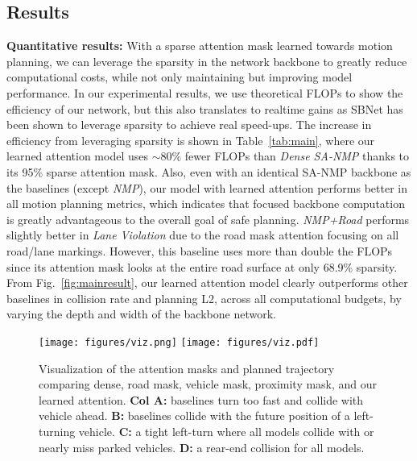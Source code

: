 


\subsection{Results}

\textbf{Quantitative results:} With a sparse attention mask learned towards motion planning, we can leverage the sparsity in the network backbone to greatly reduce computational costs, while not only maintaining but improving model performance. In our experimental results, we use theoretical FLOPs to show the efficiency of our network, but this also translates to realtime gains as SBNet \cite{sbnet} has been shown to leverage sparsity to achieve real speed-ups.
The increase in efficiency from leveraging sparsity is shown in Table~\ref{tab:main}, where our learned attention model uses $\sim80\%$ fewer FLOPs than \textit{Dense SA-NMP} thanks to its 95\% sparse attention mask. Also, even with an identical SA-NMP backbone as the baselines (except \textit{NMP}), our model with
learned attention performs better in all motion planning metrics, which indicates that focused backbone computation is greatly advantageous to the overall goal of safe planning. \textit{NMP+Road} performs slightly better in \textit{Lane Violation} due to the road mask attention focusing on all road/lane markings. However, this baseline uses more than double the FLOPs since its attention mask looks at the entire road surface at only 68.9\% sparsity. From Fig.~\ref{fig:mainresult}, our learned attention model clearly outperforms other baselines in collision rate and planning L2, across all computational budgets, by varying the depth and width of the backbone network.

\begin{figure*}[t]
\centering
  \iflatexml
  \texttt{[image: figures/viz.png]}
  \else
  \texttt{[image: figures/viz.pdf]}
  \vspace{-0.2in}
  \fi
  \caption{\small Visualization of the attention masks and planned trajectory comparing dense, road mask, vehicle mask, proximity mask, and our learned attention. %
  \textbf{Col A:} baselines turn too fast and collide with vehicle ahead. \textbf{B:} baselines collide with the future position of a left-turning vehicle. \textbf{C:} a tight left-turn where all models collide with or nearly miss parked vehicles. \textbf{D:} a
  rear-end collision for all models.}
  \label{fig:joint_vis}
  \vspace{-0.1in}
\end{figure*}

